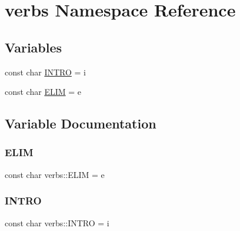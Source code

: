 \hypertarget{namespaceverbs}{}\section{verbs Namespace Reference}
\label{namespaceverbs}
\subsection*{Variables}
\begin{DoxyCompactItemize}
\item 
const char \hyperlink{namespaceverbs_a160cd2b49b96eb11b6db907bf94b5c3a}{I\+N\+T\+RO} = \textquotesingle{}i\textquotesingle{}
\item 
const char \hyperlink{namespaceverbs_ae28355cc9321ebee9abcd23bb6e1b836}{E\+L\+IM} = \textquotesingle{}e\textquotesingle{}
\end{DoxyCompactItemize}


\subsection{Variable Documentation}
\mbox{\label{namespaceverbs_ae28355cc9321ebee9abcd23bb6e1b836}} 
\subsubsection{\texorpdfstring{E\+L\+IM}{ELIM}}
{\footnotesize\ttfamily const char verbs\+::\+E\+L\+IM = \textquotesingle{}e\textquotesingle{}}

\mbox{\label{namespaceverbs_a160cd2b49b96eb11b6db907bf94b5c3a}} 
\subsubsection{\texorpdfstring{I\+N\+T\+RO}{INTRO}}
{\footnotesize\ttfamily const char verbs\+::\+I\+N\+T\+RO = \textquotesingle{}i\textquotesingle{}}

